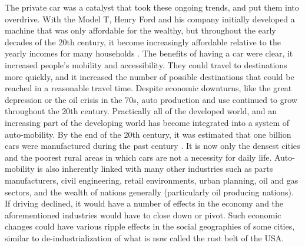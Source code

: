 The private car was a catalyst that took these ongoing trends, and put them into overdrive. With the Model T, Henry Ford and his company initially developed a machine that was only affordable for the wealthy, but throughout the early decades of the 20th century, it become increasingly affordable relative to the yearly incomes for many households \cite{kunstler_geography_1994}. The benefits of having a car were clear, it increased people's mobility and accessibility. They could travel to destinations more quickly, and it increased the number of possible destinations that could be reached in a reasonable travel time. Despite economic downturns, like the great depression or the oil crisis in the 70s, auto production and use continued to grow throughout the 20th century. Practically all of the developed world, and an increasing part of the developing world has become integrated into a system of auto-mobility. By the end of the 20th century, it was estimated that one billion cars were manufactured during the past century \cite{urry_systemautomobility_2004}. It is now only the densest cities and the poorest rural areas in which cars are not a necessity for daily life. Auto-mobility is also inherently linked with many other industries such as parts manufacturers, civil engineering, retail environments, urban planning, oil and gas sectors, and the wealth of nations generally (particularly oil producing nations). If driving declined, it would have a number of effects in the economy and the aforementioned industries would have to close down or pivot. Such economic changes could have various ripple effects in the social geographies of some cities, similar to de-industrialization of what is now called the rust belt of the USA.


